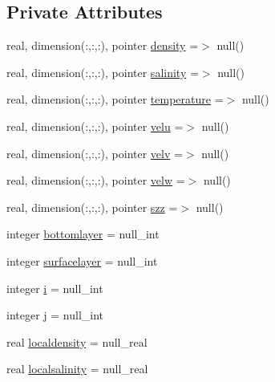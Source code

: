 \subsection*{Private Attributes}
\begin{DoxyCompactItemize}
\item 
real, dimension(\+:,\+:,\+:), pointer \mbox{\hyperlink{structmodulejet_1_1t__ambient_a863450ca063ff652b88e5ce52bd3523d}{density}} =$>$ null()
\item 
real, dimension(\+:,\+:,\+:), pointer \mbox{\hyperlink{structmodulejet_1_1t__ambient_ad54ab8db8b811cfa6eb37128b6e4ffb6}{salinity}} =$>$ null()
\item 
real, dimension(\+:,\+:,\+:), pointer \mbox{\hyperlink{structmodulejet_1_1t__ambient_a18a3dcedc873a86dee7d41872ffccf0c}{temperature}} =$>$ null()
\item 
real, dimension(\+:,\+:,\+:), pointer \mbox{\hyperlink{structmodulejet_1_1t__ambient_a727e83657bd30d261b920d0d73bc299f}{velu}} =$>$ null()
\item 
real, dimension(\+:,\+:,\+:), pointer \mbox{\hyperlink{structmodulejet_1_1t__ambient_ac17b50c68f122b0a0c84bfe23d1abdf2}{velv}} =$>$ null()
\item 
real, dimension(\+:,\+:,\+:), pointer \mbox{\hyperlink{structmodulejet_1_1t__ambient_a8c17594839b6136e972e81712abc3b71}{velw}} =$>$ null()
\item 
real, dimension(\+:,\+:,\+:), pointer \mbox{\hyperlink{structmodulejet_1_1t__ambient_afe35dc0bfb81bf19b99b6f9a9f75b886}{szz}} =$>$ null()
\item 
integer \mbox{\hyperlink{structmodulejet_1_1t__ambient_a5c3265ef61d71e0098814a86d2b99d4c}{bottomlayer}} = null\+\_\+int
\item 
integer \mbox{\hyperlink{structmodulejet_1_1t__ambient_a92f159a0644ad2390a2a05208b870a11}{surfacelayer}} = null\+\_\+int
\item 
integer \mbox{\hyperlink{structmodulejet_1_1t__ambient_a07eb8db98a4b0ef43facafec27747b6c}{i}} = null\+\_\+int
\item 
integer \mbox{\hyperlink{structmodulejet_1_1t__ambient_a02c7947b7481bf565860c4df28144b30}{j}} = null\+\_\+int
\item 
real \mbox{\hyperlink{structmodulejet_1_1t__ambient_a9c07596d81c33263924a031b7d362ede}{localdensity}} = null\+\_\+real
\item 
real \mbox{\hyperlink{structmodulejet_1_1t__ambient_a6b8cf3e374bebe63e74180bdef5c0355}{localsalinity}} = null\+\_\+real
\item 

\end{DoxyCompactItemize}
